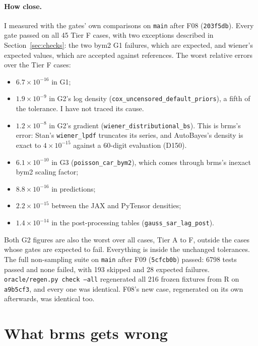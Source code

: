\documentclass[11pt]{article}
\newcommand{\code}[1]{\texttt{#1}}
\begin{document}
\paragraph{How close.} I measured with the gates' own comparisons on \code{main} after F08 (\code{203f5db}). Every gate
passed on all 45 Tier F cases, with two exceptions described in Section~\ref{sec:checks}: the two bym2 G1 failures,
which are expected, and wiener's expected values, which are accepted against references. The worst relative errors over
the Tier F cases:
\begin{itemize}
\item $6.7\times10^{-16}$ in G1;
\item $1.9\times10^{-9}$ in G2's log density (\code{cox\_uncensored\_default\_priors}), a fifth of the tolerance. I have
  not traced its cause.
\item $1.2\times10^{-8}$ in G2's gradient (\code{wiener\_distributional\_bs}). This is brms's error: Stan's
  \code{wiener\_lpdf} truncates its series, and AutoBayes's density is exact to $4\times10^{-15}$ against a 60-digit
  evaluation (D150).
\item $6.1\times10^{-10}$ in G3 (\code{poisson\_car\_bym2}), which comes through brms's inexact bym2 scaling factor;
\item $8.8\times10^{-16}$ in predictions;
\item $2.2\times10^{-15}$ between the JAX and PyTensor densities;
\item $1.4\times10^{-14}$ in the post-processing tables (\code{gauss\_sar\_lag\_post}).
\end{itemize}
Both G2 figures are also the worst over all cases, Tier A to F, outside the cases whose gates are expected to fail.
Everything is inside the unchanged tolerances.
The full non-sampling suite on \code{main} after F09 (\code{5cfcb0b}) passed: 6798 tests passed and none failed, with 193 skipped and 28 expected failures.
\code{oracle/regen.py check --all} regenerated all 216 frozen fixtures from R on \code{a9b5cf3}, and every one was
identical. F08's new case, regenerated on its own afterwards, was identical too.

\section{What brms gets wrong}
\label{sec:brms}
\end{document}
